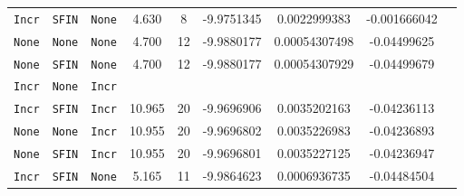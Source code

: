 \begin{center}
\begin{table}[H]
\begin{tabular*}{\textwidth}{@{\extracolsep\fill}ccccccccc@{}}
  \texttt{Incr} & \texttt{SFIN} & \texttt{None} &  4.630 &  8 &  -9.9751345 &  0.0022999383  &  -0.001666042 \\
  \texttt{None} & \texttt{None} & \texttt{None} &  4.700 & 12 &  -9.9880177 &  0.00054307498 &  -0.04499625 \\
  \texttt{None} & \texttt{SFIN} & \texttt{None} &  4.700 & 12 &  -9.9880177 &  0.00054307929 &  -0.04499679 \\
  \texttt{Incr} & \texttt{None} & \texttt{Incr}  \\
  \texttt{Incr} & \texttt{SFIN} & \texttt{Incr} & 10.965 & 20 &  -9.9696906 &  0.0035202163  &  -0.04236113 \\
  \texttt{None} & \texttt{None} & \texttt{Incr} & 10.955 & 20 &  -9.9696802 &  0.0035226983  &  -0.04236893 \\
  \texttt{None} & \texttt{SFIN} & \texttt{Incr} & 10.955 & 20 &  -9.9696801 &  0.0035227125  &  -0.04236947 \\
  \texttt{Incr} & \texttt{SFIN} & \texttt{None} &  5.165 & 11 &  -9.9864623 &  0.0006936735  &  -0.04484504 \\
\bottomrule
\end{tabular*}
\end{table}
\end{center}
